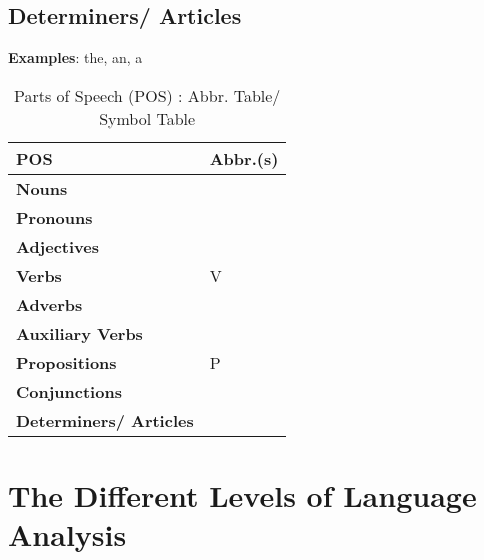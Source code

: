 \subsection{Determiners/ Articles}

\textbf{Examples}: the, an, a

\begin{longtable}{|m{3cm}|m{1.3cm}|}
    \caption{Parts of Speech (POS) : Abbr. Table/ Symbol Table} \\ \hline
    
    \textbf{POS} & \textbf{Abbr.(s)} \\ \hline
    \endfirsthead
    
    \hline
    \endhead
    
    \hline
    \endfoot
    
    \hline
    \endlastfoot

    \textbf{Nouns} & \\ \hline
    \textbf{Pronouns} & \\ \hline
    \textbf{Adjectives} & \\ \hline
    \textbf{Verbs} & V \\ \hline
    \textbf{Adverbs} & \\ \hline
    \textbf{Auxiliary Verbs} &  \\ \hline
    \textbf{Propositions} & P \\ \hline
    \textbf{Conjunctions} &  \\ \hline
    \textbf{Determiners/ Articles} & \\ \hline

\end{longtable}

\section{The Different Levels of Language Analysis \cite{medium-levels-in-natural-language-processing-nlp}}

